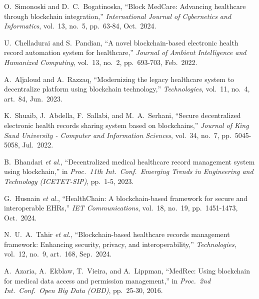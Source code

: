 \documentclass[12pt,a4wide]{report}
\begin{document}
\begin{enumerate}[leftmargin=2.5em, label={[\arabic*]}]

  \item O.\ Simonoski and D.\ C.\ Bogatinoska, ``Block MedCare: Advancing
    healthcare through blockchain integration,'' \textit{International Journal of
    Cybernetics and Informatics}, vol.\ 13, no.\ 5, pp.\ 63-84, Oct.\ 2024.

  \item U.\ Chelladurai and S.\ Pandian, ``A novel blockchain-based electronic
    health record automation system for healthcare,'' \textit{Journal of Ambient
    Intelligence and Humanized Computing}, vol.\ 13, no.\ 2, pp.\ 693-703,
    Feb.\ 2022.

  \item A.\ Aljaloud and A.\ Razzaq, ``Modernizing the legacy healthcare system to
    decentralize platform using blockchain technology,'' \textit{Technologies},
    vol.\ 11, no.\ 4, art.\ 84, Jun.\ 2023.

  \item K.\ Shuaib, J.\ Abdella, F.\ Sallabi, and M.\ A.\ Serhani, ``Secure
    decentralized electronic health records sharing system based on blockchains,''
    \textit{Journal of King Saud University - Computer and Information Sciences},
    vol.\ 34, no.\ 7, pp.\ 5045-5058, Jul.\ 2022.

  \item B.\ Bhandari \textit{et al.}, ``Decentralized medical healthcare record
    management system using blockchain,'' in \textit{Proc.\ 11th Int.\ Conf.\
    Emerging Trends in Engineering and Technology (ICETET-SIP)}, pp.\ 1-5, 2023.

  \item G.\ Husnain \textit{et al.}, ``HealthChain: A blockchain-based framework
    for secure and interoperable EHRs,'' \textit{IET Communications}, vol.\ 18,
    no.\ 19, pp.\ 1451-1473, Oct.\ 2024.

  \item N.\ U.\ A.\ Tahir \textit{et al.}, ``Blockchain-based healthcare records
    management framework: Enhancing security, privacy, and interoperability,''
    \textit{Technologies}, vol.\ 12, no.\ 9, art.\ 168, Sep.\ 2024.

  \item A.\ Azaria, A.\ Ekblaw, T.\ Vieira, and A.\ Lippman, ``MedRec: Using
    blockchain for medical data access and permission management,'' in
    \textit{Proc.\ 2nd Int.\ Conf.\ Open Big Data (OBD)}, pp.\ 25-30, 2016.


\end{enumerate}
\end{document}

